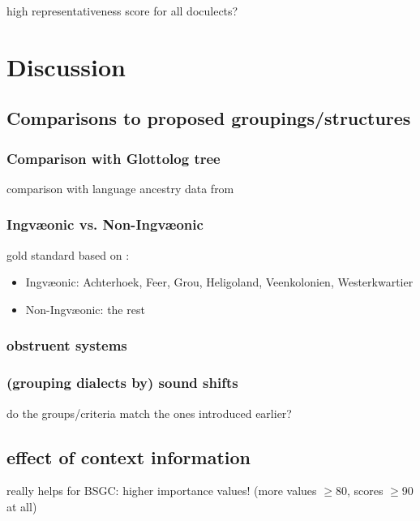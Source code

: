 \documentclass[a4paper]{article}
\begin{document}

high representativeness score for all doculects?


\newpage
\section{Discussion}
\label{sec:discussion}


\subsection{Comparisons to proposed groupings/structures}
\subsubsection{Comparison with Glottolog tree}
comparison with language ancestry data from \citet{hammarstroem2018glottolog}

\subsubsection{Ingv\ae{}onic vs. Non-Ingv\ae{}onic}
gold standard based on \citet{stiles2013pan-west}:
\begin{itemize}
\item
Ingv\ae{}onic:
Achterhoek, Feer, Grou, Heligoland, Veenkolonien, Westerkwartier
\item
Non-Ingv\ae{}onic:
the rest
\end{itemize}

\subsubsection{obstruent systems}

\subsubsection{(grouping dialects by) sound shifts}

do the groups/criteria match the ones introduced earlier?

\subsection{effect of context information}

really helps for BSGC: higher importance values! (more values $\geq$80, scores $\geq$90 at all)
\end{document}
